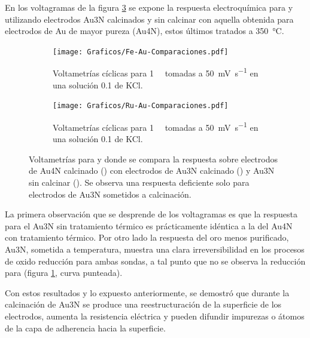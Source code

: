 
			En los voltagramas de la figura \ref{Fig:Comparacion-Au} se expone la respuesta electroquímica  para \ru\space y \fe\space utilizando electrodos Au3N calcinados y sin calcinar con aquella obtenida para electrodos de Au de mayor pureza (Au4N), estos últimos tratados a \SI{350}{\celsius}. 

				\begin{figure}[ht]
		 	      \begin{subfigure}[t]{0.495\textwidth}
		          	\texttt{[image: Graficos/Fe-Au-Comparaciones.pdf]}
		         	\caption{Voltametrías cíclicas para \fe\space \SI{1}{\milli\Molar} tomadas a \SI{50}{\milli\volt\per\second} en una solución \SI{0.1}{\Molar} de KCl.}
		          	\label{fig:Fe-Au-compa}
		      		\end{subfigure}
		      	 \begin{subfigure}[t]{0.495\textwidth}
		          	\texttt{[image: Graficos/Ru-Au-Comparaciones.pdf]}
		         	\caption{Voltametrías cíclicas para \ru\space \SI{1}{\milli\Molar} tomadas a \SI{50}{\milli\volt\per\second} en una solución \SI{0.1}{\Molar} de KCl.}
		          	\label{fig:Ru-Au-compa}
		      		\end{subfigure}
		      	 \caption[Comparación entre electrodos calcinados y sin calcinar]{Voltametrías para \ferroferri\space y \aminorutenio\space donde se compara la respuesta sobre electrodos de Au4N calcinado (\usebox{\negro}) con electrodos de Au3N calcinado (\usebox{\punteado}) y Au3N sin calcinar (\usebox{\rojo}). Se observa una respuesta deficiente solo para electrodos de Au3N sometidos a calcinación.}
		      	 \label{Fig:Comparacion-Au}
	      		 \end{figure}	

			La primera observación que se desprende de los voltagramas es que la respuesta para el Au3N sin tratamiento térmico es prácticamente idéntica a la del Au4N con tratamiento térmico. Por otro lado la respuesta del oro menos purificado, Au3N, sometida a temperatura, muestra una clara irreversibilidad en los procesos de oxido reducción para ambas sondas, a tal punto que no se observa la reducción para \ferroferri\space (figura \ref{fig:Fe-Au-compa}, curva punteada).  

		    Con estos resultados y lo expuesto anteriormente, se demostró que durante la calcinación de Au3N se produce una reestructuración de la superficie de los electrodos, aumenta la resistencia eléctrica y pueden difundir impurezas o átomos de la capa de adherencia hacia la superficie. 

